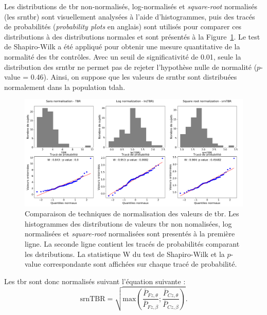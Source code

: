 Les distributions de \gls{tbr} non-normalisés, log-normalisés et \textit{square-root} normalisés (les \gls{srntbr}) sont visuellement analysées à l'aide 
d'histogrammes, puis des tracés de probabilités (\textit{probability plots} en anglais) sont utilisés pour comparer ces distributions à des distributions normales 
et sont présentés à la Figure~\ref{Figure:tbr_normalization}. Le test de Shapiro-Wilk \citep{Shapiro1965} a été appliqué pour obtenir une mesure quantitative 
de la normalité des \gls{tbr} contrôles. Avec un seuil de significativité de 0.01, seule la distribution des \gls{srntbr} ne permet pas de rejeter l'hypothèse
nulle de normalité ($p$-value = 0.46). Ainsi, on suppose que les valeurs de \gls{srntbr} sont distribuées normalement dans la population \gls{tdah}. 

\begin{figure}[h!]
  \centering
	\includegraphics[width=1.0\linewidth]{figures/chapter-4/tbr-normalization} 
  \caption[Comparaison de techniques de normalisation des valeurs de \gls{tbr}.]{Comparaison de techniques de normalisation des valeurs de \gls{tbr}. 
	Les histogrammes des distributions de valeurs \gls{tbr} non nomalisées,
	log normalisées et \textit{square-root} normalisées sont presentés à la première ligne. La seconde ligne contient les tracés de probabilités comparant les
	dstributions. La statistique W du test de Shapiro-Wilk et la $p$-value correspondante sont affichées sur chaque tracé de probabilité.}
  \label{Figure:tbr_normalization}
\end{figure}

Les \gls{tbr} sont donc normalisés suivant l'équation suivante :
\begin{equation}
\label{eq:tbr_srntbr_computation}
\text{srnTBR} = \sqrt{ \text{max}(\frac{\bar{P}_{Fz,\theta}}{\bar{P}_{Fz,\beta} } ; \frac{\bar{P}_{Cz,\theta}}{\bar{P}_{Cz,\beta}} ) }.
\end{equation}

